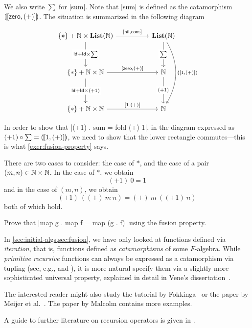 \begin{solution}
  We also write $\sum$ for |sum|. Note that |sum| is defined as the catamorphism $\llparenthesis [\mathsf{zero}, (+)] \rrparenthesis$.
  The situation is summarized in the following diagram
  
  \[
    \begin{tikzcd}[row sep = huge, column sep = huge]
      \{*\} + \NN \times \List(\NN)
      \ar[d, "\Id + \Id \times \sum" description]
      \ar[r, "{[\nil, \cons]}"]
      &
      \List(\NN)
      \ar[d, "\sum" description]
      \ar[dd, bend left, "\catam{[1, (+)]}"]
      \\
      \{*\} + \NN \times \NN
      \ar[r, "{[\Zero, (+)]}"]
      \ar[d, "{\Id + \Id \times (+1)}" description]
      &
      \NN
      \ar[d, "{(+1)}" description]
      \\
      \{*\} + \NN \times \NN
      \ar[r, "{[1, (+)]}"]
      &
      \NN 
    \end{tikzcd}
  \]

  In order to show that |(+1) . sum = fold (+) 1|, in the diagram expressed as $(+1) \circ \sum = \llparenthesis [1, (+)] \rrparenthesis$, we need to show that the lower rectangle commutes---this is what  \cref{exer:fusion-property} says.

  There are two cases to consider: the case of $*$, and the case of a pair $(m,n) \in \mathbb{N}\times\mathbb{N}$.
  In the case of $*$, we obtain
  \[
    (+1)~0 = 1
  \]
  and in the case of $(m,n)$, we obtain
  \[
    (+1)~ ((+)~ m~ n) = (+)~ m~ ((+1)~n)
  \]
  both of which hold.
  
\end{solution}

\begin{exer}
  Prove that |map g . map f = map (g . f)| using the fusion property.
\end{exer}


\begin{reading*}
  In \cref{sec:initial-algs,sec:fusion}, we have only looked at functions defined via \emph{iteration}, that is, functions defined as \emph{catamorphisms} of some $F$-algebra.
  While \emph{primitive recursive} functions can always be expressed as a catamorphism via tupling (see, e.g., \cite[\S4]{DBLP:journals/jfp/Hutton99} and \cite[\S3.1]{vene_phd}), it is more natural specify them via a slightly more sophisticated universal property, explained in detail in Vene's dissertation~\cite[Chapter~3]{vene_phd}.

  The interested reader might also study the tutorial by Fokkinga~\cite{Fokkinga_homo-cata} or the paper by Meijer et al.~\cite{DBLP:conf/fpca/MeijerFP91}.
  The paper \cite{DBLP:journals/scp/Malcolm90} by Malcolm contains more examples.
  
  A guide to further literature on recursion operators is given in \cite[\S6]{DBLP:journals/jfp/Hutton99}.
\end{reading*}

